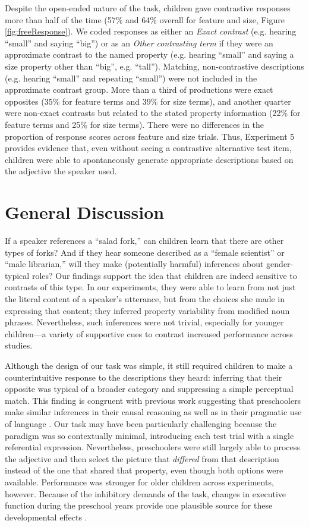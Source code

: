 \documentclass[man]{apa2}
\begin{document}
Despite the open-ended nature of the task, children gave contrastive responses more than half of the time (57\% and 64\% overall for feature and size, Figure \ref{fig:freeResponse}).  We coded responses as either an \emph{Exact contrast} (e.g. hearing ``small'' and saying ``big'') or as an \emph{Other contrasting term} if they were an approximate contrast to the named property (e.g. hearing ``small'' and saying a size property other than ``big'', e.g. ``tall''). Matching, non-contrastive descriptions (e.g. hearing ``small'' and repeating ``small'') were not included in the approximate contrast group. More than a third of productions were exact opposites (35\% for feature terms and 39\% for size terms), and another quarter were non-exact contrasts but related to the stated property information (22\% for feature terms and 25\% for size terms). There were no differences in the proportion of response scores across feature and size trials. Thus, Experiment 5 provides evidence that, even without seeing a contrastive alternative test item, children were able to spontaneously generate appropriate descriptions based on the adjective the speaker used. 

\section{General Discussion}

If a speaker references a ``salad fork,'' can children learn that there are other types of forks? And if they hear someone described as a ``female scientist'' or ``male librarian,'' will they make (potentially harmful) inferences about gender-typical roles? Our findings support the idea that children are indeed sensitive to contrasts of this type. In our experiments, they were able to learn from not just the literal content of a speaker's utterance, but from the choices she made in expressing that content; they inferred property variability from modified noun phrases. Nevertheless, such inferences were not trivial, especially for younger children---a variety of supportive cues to contrast increased performance across studies.

Although the design of our task was simple, it still required children to make a counterintuitive response to the descriptions they heard: inferring that their opposite was typical of a broader category and suppressing a simple perceptual match. This finding is congruent with previous work suggesting that preschoolers make similar inferences in their causal reasoning \cite{harris1996} as well as in their pragmatic use of language \cite{barner2011,stiller2014}. Our task may have been particularly challenging because the paradigm was so contextually minimal, introducing each test trial with a single referential expression. Nevertheless, preschoolers were still largely able to process the adjective and then select the picture that \emph{differed} from that description instead of the one that shared that property, even though both options were available. Performance was stronger for older children across experiments, however. Because of the inhibitory demands of the task, changes in executive function during the preschool years provide one plausible source for these developmental effects \cite{davidson2006,zelazo2003}. 
\end{document}
